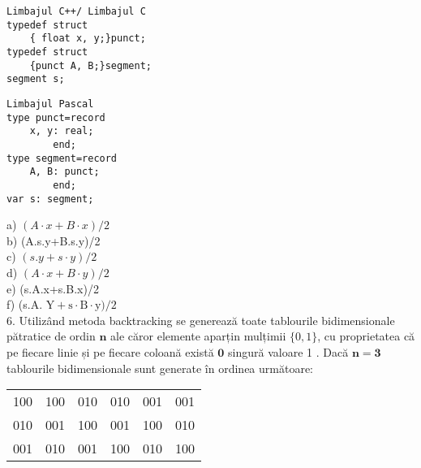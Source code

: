 \begin{verbatim}
Limbajul C++/ Limbajul C
typedef struct
    { float x, y;}punct;
typedef struct
    {punct A, B;}segment;
segment s;
\end{verbatim}

\begin{verbatim}
Limbajul Pascal
type punct=record
    x, y: real;
        end;
type segment=record
    A, B: punct;
        end;
var s: segment;
\end{verbatim}

a) $(A \cdot x+B \cdot x) / 2$\\
b) (A.s.y+B.s.y)/2\\
c) $(s . y+s \cdot y) / 2$\\
d) $(A \cdot x+B \cdot y) / 2$\\
e) (s.A.x+s.B.x)/2\\
f) (s.A. $\mathrm{Y}+\mathrm{s} \cdot \mathrm{B} \cdot \mathrm{y}) / 2$\\
6. Utilizând metoda backtracking se generează toate tablourile bidimensionale pătratice de ordin $\mathbf{n}$ ale căror elemente aparțin mulțimii $\{0,1\}$, cu proprietatea că pe fiecare linie și pe fiecare coloană există $\mathbf{0}$ singură valoare 1 . Dacă $\mathbf{n}=\mathbf{3}$ tablourile bidimensionale sunt generate în ordinea următoare:

\begin{center}
\begin{tabular}{llllll}
100 & 100 & 010 & 010 & 001 & 001 \\
010 & 001 & 100 & 001 & 100 & 010 \\
001 & 010 & 001 & 100 & 010 & 100 \\
\end{tabular}
\end{center}

